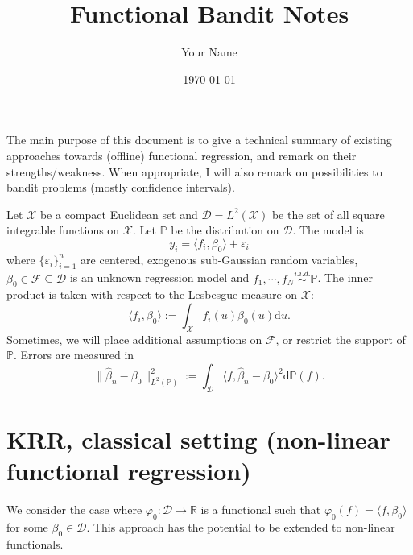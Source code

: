 \documentclass[11pt,a4paper]{article}
\title{Functional Bandit Notes}
\author{Your Name}
\date{\today}
\renewcommand{\hat}{\widehat}
\theoremstyle{definition}
\theoremstyle{plain}
\theoremstyle{remark}
\newcommand{\mX}{\mathcal X}
\newcommand{\mD}{\mathcal D}
\newcommand{\bP}{\mathbb P}
\newcommand{\lp}{L^2(\bP)}
\newcommand{\ud}{\mathrm d}
\begin{document}
The main purpose of this document is to give a technical summary of existing approaches towards (offline) functional regression,
and remark on their strengths/weakness. When appropriate, I will also remark on possibilities to bandit problems (mostly confidence intervals).

Let $\mX$ be a compact Euclidean set and $\mD=L^2(\mX)$ be the set of all square integrable functions on $\mX$.
Let $\mathbb P$ be the distribution on $\mD$. The model is 
$$
y_i = \langle f_i, \beta_0\rangle + \varepsilon_i
$$
where $\{\varepsilon_i\}_{i=1}^n$ are centered, exogenous sub-Gaussian random variables, $\beta_0\in\mathcal F\subseteq \mD$ is an unknown regression model and $f_1,\cdots,f_N\overset{i.i.d.}{\sim}\mathbb P$.
The inner product is taken with respect to the Lesbesgue measure on $\mX$:
$$
\langle f_i, \beta_0\rangle := \int_{\mX} f_i(u)\beta_0(u)\ud u.
$$
Sometimes, we will place additional assumptions on $\mathcal F$, or restrict the support of $\bP$.
Errors are measured in 
$$
\|\hat \beta_n-\beta_0\|_{\lp}^2 := \int_{\mD} \langle f, \hat \beta_n-\beta_0\rangle^2\ud\bP(f).
$$

\section{KRR, classical setting (non-linear functional regression)}

We consider the case where $\varphi_0:\mD\to\mathbb R$ is a functional such that $\varphi_0(f)=\langle f,\beta_0\rangle$ for some $\beta_0\in\mD$. 
This approach has the potential to be extended to non-linear functionals.
\end{document}
